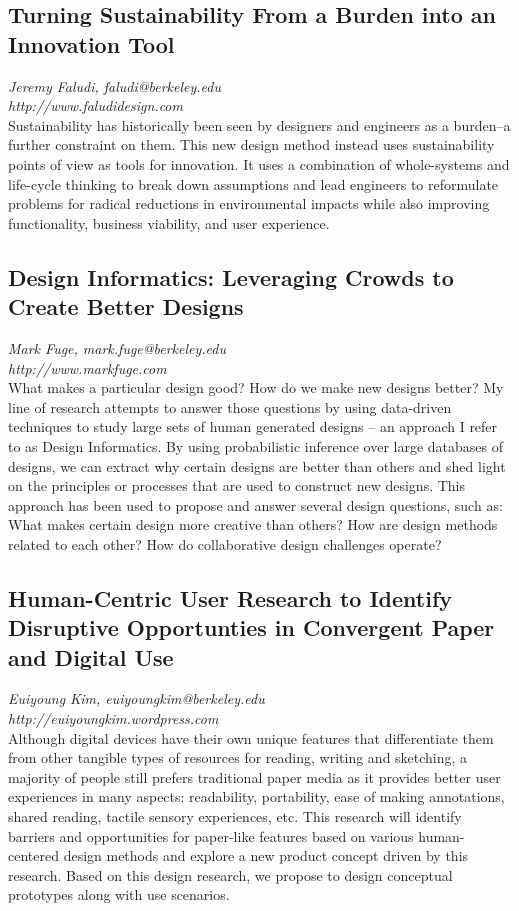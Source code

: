 \documentclass[foldmark,10pt,a4paper,notumble]{leaflet}
\begin{document}
\subsection{Turning Sustainability From a Burden into an Innovation Tool}
\emph{Jeremy Faludi, faludi@berkeley.edu}\\
\emph{http://www.faludidesign.com}\\
Sustainability has historically been seen by designers and engineers as a burden--a further constraint on them.  This new design method instead uses sustainability points of view as tools for innovation.  It uses a combination of whole-systems and life-cycle thinking to break down assumptions and lead engineers to reformulate problems for radical reductions in environmental impacts while also improving functionality, business viability, and user experience.

\subsection{Design Informatics: Leveraging Crowds to Create Better Designs}
\emph{Mark Fuge, mark.fuge@berkeley.edu}\\
\emph{http://www.markfuge.com}\\
What makes a particular design good? How do we make new designs better? My line of research attempts to answer those questions by using data-driven techniques to study large sets of human generated designs – an approach I refer to as Design Informatics. By using probabilistic inference over large databases of designs, we can extract why certain designs are better than others and shed light on the principles or processes that are used to construct new designs. This approach has been used to propose and answer several design questions, such as: What makes certain design more creative than others? How are design methods related to each other? How do collaborative design challenges operate?

\subsection{Human-Centric User Research to Identify Disruptive Opportunties in Convergent Paper and Digital Use}
\emph{Euiyoung Kim, euiyoungkim@berkeley.edu}\\
\emph{http://euiyoungkim.wordpress.com}\\
Although digital devices have their own unique features that differentiate them from other
tangible types of resources for reading, writing and sketching, a majority of people still prefers traditional
paper media as it provides better user experiences in many aspects: readability, portability, ease of
making annotations, shared reading, tactile sensory experiences, etc. This research will identify
barriers and opportunities for paper-like features based on various human-centered design methods and
explore a new product concept driven by this research. Based on this design research, we propose to
design conceptual prototypes along with use scenarios. 
\end{document}
